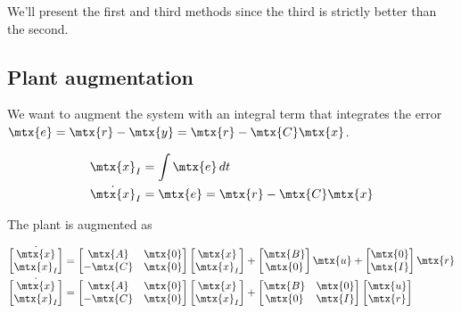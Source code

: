 We'll present the first and third methods since the third is strictly better
than the second.

\subsection{Plant augmentation}

We want to augment the \gls{system} with an integral term that integrates the
\gls{error} $\mtx{e} = \mtx{r} - \mtx{y} = \mtx{r} - \mtx{C}\mtx{x}$.

\begin{align*}
  \mtx{x}_I &= \int \mtx{e} \,dt \\
  \dot{\mtx{x}}_I &= \mtx{e} = \mtx{r} - \mtx{C}\mtx{x}
\end{align*}

The \gls{plant} is augmented as

\begin{align*}
  \dot{\begin{bmatrix}
    \mtx{x} \\
    \mtx{x}_I
  \end{bmatrix}} &=
  \begin{bmatrix}
    \mtx{A} & \mtx{0} \\
    -\mtx{C} & \mtx{0}
  \end{bmatrix}
  \begin{bmatrix}
    \mtx{x} \\
    \mtx{x}_I
  \end{bmatrix} +
  \begin{bmatrix}
    \mtx{B} \\
    \mtx{0}
  \end{bmatrix}
  \mtx{u} +
  \begin{bmatrix}
    \mtx{0} \\
    \mtx{I}
  \end{bmatrix}
  \mtx{r} \\
  \dot{\begin{bmatrix}
    \mtx{x} \\
    \mtx{x}_I
  \end{bmatrix}} &=
  \begin{bmatrix}
    \mtx{A} & \mtx{0} \\
    -\mtx{C} & \mtx{0}
  \end{bmatrix}
  \begin{bmatrix}
    \mtx{x} \\
    \mtx{x}_I
  \end{bmatrix} +
  \begin{bmatrix}
    \mtx{B} & \mtx{0} \\
    \mtx{0} & \mtx{I}
  \end{bmatrix}
  \begin{bmatrix}
    \mtx{u} \\
    \mtx{r}
  \end{bmatrix}
\end{align*}

